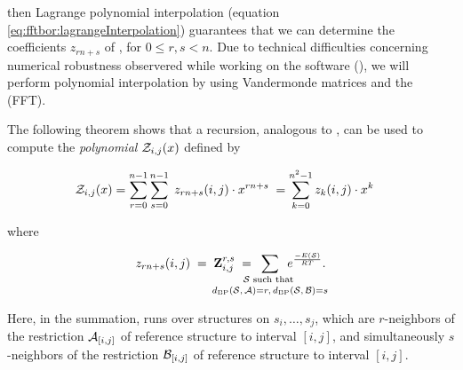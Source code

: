 then Lagrange polynomial interpolation
(equation \ref{eq:fftbor:lagrangeInterpolation})
guarantees that we can determine the coefficients $z_{rn+s}$ of \fullZx,
for $0 \leq r,s < n$. Due to technical difficulties concerning numerical
robustness observered while working on the \fftbor software
(), we will perform polynomial interpolation
by using Vandermonde matrices and the \fft (FFT).

The following theorem shows that a
recursion, analogous to ,
can be used to compute
the {\em polynomial} ${\mathcal Z}_{i,j}(x)$ defined by

\begin{align}
\label{eq:ffttwo:emZij}
\emZ{i,j} &= \sum_{r=0}^{n-1} \sum_{s=0}^{n-1}\;
z_{rn+s}(i,j) \cdot x^{rn+s}\; =
\sum_{k=0}^{n^2-1} z_{k}(i,j) \cdot x^{k}
\end{align}

where

\begin{align}
z_{rn+s}(i,j) \;=\; \bfZ{r,s}{i,j}\;=
\enspace\sum_{\mathclap{\substack{
\str \text{ such that } \rule[-.5ex]{0pt}{0pt} \\
\dBP{\str}{\strA} = r,\,\dBP{\str}{\strB} = s
}}}\enspace
\boltzF{\str}.
\end{align}

Here, in the summation, \str runs over structures on $s_i,\dots,s_j$, which
are $r$-neighbors of the restriction $\mathcal A_{[i,j]}$ of reference structure
\strA to interval $[i,j]$, and simultaneously
$s$-neighbors of the restriction $\mathcal B_{[i,j]}$ of reference structure
\strB to interval $[i,j]$.

